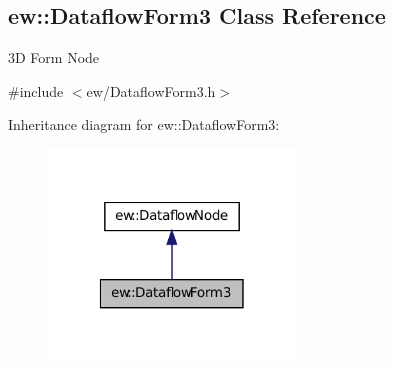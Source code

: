 \hypertarget{classew_1_1DataflowForm3}{
\subsection{ew::DataflowForm3 Class Reference}
\label{classew_1_1DataflowForm3}
}


3D Form Node  




{\ttfamily \#include $<$ew/DataflowForm3.h$>$}



Inheritance diagram for ew::DataflowForm3:
\nopagebreak
\begin{figure}[H]
\begin{center}
\leavevmode
\includegraphics[width=186pt]{classew_1_1DataflowForm3__inherit__graph}
\end{center}
\end{figure}
